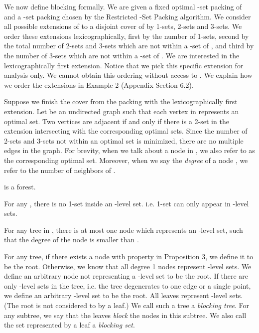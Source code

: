 \documentclass[runningheads,a4paper]{llncs}
\numberwithin{equation}{section}
\begin{document}
We now define blocking formally. We are given a fixed optimal -set packing  of  and a -set packing  chosen by the Restricted -Set Packing algorithm. We consider all possible extensions of  to a disjoint cover of  by 1-sets, 2-sets and 3-sets. We order these extensions lexicographically, first by the number of 1-sets, second by the total number of 2-sets and 3-sets which are not within a -set of , and third by the number of 3-sets which are not within a -set of . We are interested in the lexicographically first extension. Notice that we pick this specific extension for analysis only. We cannot obtain this ordering without access to . We explain how we order the extensions in Example 2 (Appendix Section 6.2).

Suppose we finish the cover from the packing  with the lexicographically first extension. Let  be an undirected graph such that each vertex in  represents an optimal set. Two vertices are adjacent if and only if there is a 2-set in the extension intersecting with the corresponding optimal sets. Since the number of 2-sets and 3-sets not within an optimal set is minimized, there are no multiple edges in the graph. For brevity, when we talk about a node  in , we also refer to  as the corresponding optimal set. Moreover, when we say the \emph{degree} of a node , we refer to the number of neighbors of .


\begin{proposition}
 is a forest.
\end{proposition}

\begin{proposition}
For any , there is no 1-set inside an -level set. i.e. 1-set can only appear in -level sets.
\end{proposition}

\begin{proposition}
For any tree  in , there is at most one node which represents an -level set, such that the degree of the node is smaller than .
\end{proposition}

For any tree, if there exists a node with property in Proposition 3, we define it to be the root. Otherwise, we know that all degree 1 nodes represent -level sets. We define an arbitrary node not representing a -level set to be the root. If there are only -level sets in the tree, i.e. the tree degenerates to one edge or a single point, we define an arbitrary -level set to be the root. All leaves represent -level sets. (The root is not considered to by a leaf.) We call such a tree a \emph{blocking tree}. For any subtree, we say that the leaves \emph{block} the nodes in this subtree. We also call the set represented by a leaf a \emph{blocking set}.
\end{document}
